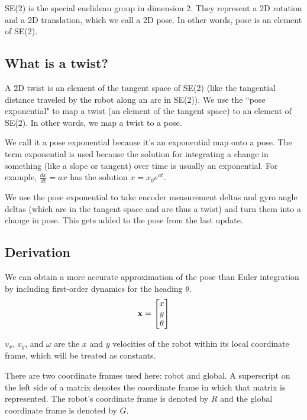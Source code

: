 SE(2) is the special euclidean group in dimension 2. They represent a 2D
rotation and a 2D translation, which we call a 2D pose. In other words, pose is
an element of SE(2).

\subsection{What is a twist?}

A 2D twist is an element of the tangent space of SE(2) (like the tangential
distance traveled by the robot along an arc in SE(2)). We use the ``pose
exponential" to map a twist (an element of the tangent space) to an element of
SE(2). In other words, we map a twist to a pose.

We call it a pose exponential because it's an exponential map onto a pose. The
term exponential is used because the solution for integrating a change in
something (like a slope or tangent) over time is usually an exponential. For
example, $\frac{dx}{dt} = ax$ has the solution $x = x_0 e^{at}$.

We use the pose exponential to take encoder measurement deltas and gyro angle
deltas (which are in the tangent space and are thus a twist) and turn them into
a change in pose. This gets added to the pose from the last update.

\subsection{Derivation}

We can obtain a more accurate approximation of the pose than Euler integration
by including first-order dynamics for the heading $\theta$.
\begin{equation*}
  \mathbf{x} = \begin{bmatrix}
    x \\
    y \\
    \theta
  \end{bmatrix}
\end{equation*}

$v_x$, $v_y$, and $\omega$ are the $x$ and $y$ velocities of the robot within
its local coordinate frame, which will be treated as constants.
\begin{remark}
  There are two coordinate frames used here: robot and global. A superscript on
  the left side of a matrix denotes the coordinate frame in which that matrix is
  represented. The robot's coordinate frame is denoted by $R$ and the global
  coordinate frame is denoted by $G$.
\end{remark}


